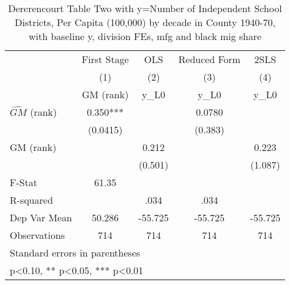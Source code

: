 \begin{table}[htbp]\centering
\def\sym#1{\ifmmode^{#1}\else\(^{#1}\)\fi}
\caption{Dererencourt Table Two with y=Number of Independent School Districts, Per Capita (100,000) by decade in County 1940-70, with baseline y, division FEs, mfg and black mig share}
\begin{tabular}{l*{4}{c}}
\toprule
                    & First Stage   &         OLS   &Reduced Form   &        2SLS   \\
                    &\multicolumn{1}{c}{(1)}&\multicolumn{1}{c}{(2)}&\multicolumn{1}{c}{(3)}&\multicolumn{1}{c}{(4)}\\
                    &\multicolumn{1}{c}{GM  (rank)}&\multicolumn{1}{c}{y\_L0}&\multicolumn{1}{c}{y\_L0}&\multicolumn{1}{c}{y\_L0}\\
\midrule
$\hat{GM}$ (rank)   &       0.350***&               &      0.0780   &               \\
                    &    (0.0415)   &               &     (0.383)   &               \\
\addlinespace
GM  (rank)          &               &       0.212   &               &       0.223   \\
                    &               &     (0.501)   &               &     (1.087)   \\
\midrule
F-Stat              &       61.35   &               &               &               \\
R-squared           &               &        .034   &        .034   &               \\
Dep Var Mean        &      50.286   &     -55.725   &     -55.725   &     -55.725   \\
Observations        &         714   &         714   &         714   &         714   \\
\bottomrule
\multicolumn{5}{l}{\footnotesize Standard errors in parentheses}\\
\multicolumn{5}{l}{\footnotesize * p<0.10, ** p<0.05, *** p<0.01}\\
\end{tabular}
\end{table}
